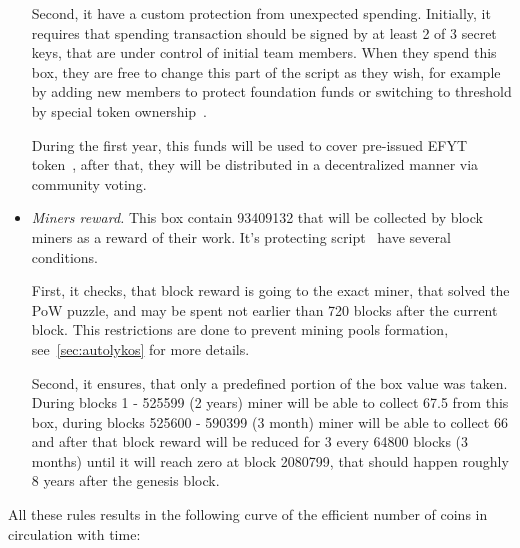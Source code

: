 \begin{itemize}
    Second, it have a custom protection from unexpected spending.
    Initially, it requires that spending transaction should be signed by at least 2 of 3 secret keys,
    that are under control of initial team members. When they spend this box, they are free to
    change this part of the script as they wish, for example by adding new members to protect foundation
    funds or switching to threshold by special token ownership~\cite{link to ...}.

    During the first year, this funds will be used to cover pre-issued EFYT token~\cite{our website},
    after that, they will be distributed in a decentralized manner via community voting.


    \item{\em Miners reward.} This box contain 93409132 \Erg{} that will be collected by block miners
    as a reward of their work.
    It's protecting script~\cite{link to corresponding ergo tree} have several conditions.

    First, it checks, that block reward is going to the exact miner, that solved the PoW puzzle, and
    may be spent not earlier than 720 blocks after the current block.
    This restrictions are done to prevent mining pools formation, see~\ref{sec:autolykos} for more details.

    Second, it ensures, that only a predefined portion of the box value was taken.
    During blocks 1 - 525599 (2 years) miner will be able to collect 67.5 \Erg{} from this box,
    during blocks 525600 - 590399 (3 month) miner will be able to collect 66 \Erg{} and after
    that block reward will be reduced for 3 \Erg{} every 64800 blocks (3 months) until it will reach zero
    at block 2080799, that should happen roughly 8 years after the genesis block.


\end{itemize}

All these rules results in the following curve of the efficient number of coins in circulation with time:

